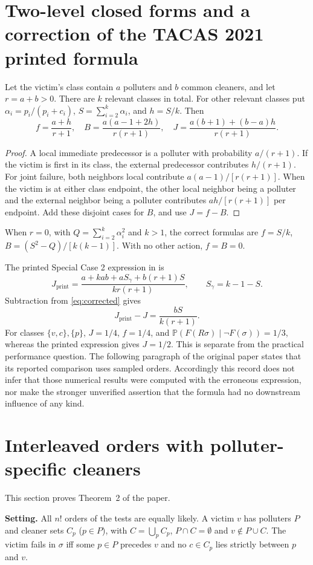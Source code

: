 \documentclass[11pt,a4paper]{article}
\theoremstyle{definition}\newtheorem{definition}[theorem]{Definition}
\theoremstyle{remark}\newtheorem{remark}[theorem]{Remark}
\newcommand{\Prb}{\mathbb P}
\theoremstyle{definition}\newtheorem{xexample}[xtheorem]{Example}\theoremstyle{plain}
\begin{document}
\section{Two-level closed forms and a correction of the TACAS 2021 printed formula}\label{sec:twolevel}
Let the victim's class contain $a$ polluters and $b$ common cleaners, and let $r=a+b>0$. There are $k$ relevant classes in total. For other relevant classes put $\alpha_i=p_i/(p_i+c_i)$, $S=\sum_{i=2}^k\alpha_i$, and $h=S/k$. Then
\begin{equation}\label{eq:corrected}
 f=\frac{a+h}{r+1},\quad
 B=\frac{a(a-1+2h)}{r(r+1)},\quad
 J=\frac{a(b+1)+(b-a)h}{r(r+1)}.
\end{equation}
\begin{proof}
A local immediate predecessor is a polluter with probability $a/(r+1)$. If the victim is first in its class, the external predecessor contributes $h/(r+1)$. For joint failure, both neighbors local contribute $a(a-1)/[r(r+1)]$. When the victim is at either class endpoint, the other local neighbor being a polluter and the external neighbor being a polluter contributes $ah/[r(r+1)]$ per endpoint. Add these disjoint cases for $B$, and use $J=f-B$.
\end{proof}
When $r=0$, with $Q=\sum_{i=2}^k\alpha_i^2$ and $k>1$, the correct formulas are $f=S/k$, $B=(S^2-Q)/[k(k-1)]$. With no other action, $f=B=0$.

The printed Special Case 2 expression in \cite[Section 4.4]{wei} is
\[
 J_{\mathrm{print}}=\frac{a+kab+aS_\gamma+b(r+1)S}{kr(r+1)},
 \qquad S_\gamma=k-1-S.
\]
Subtraction from \eqref{eq:corrected} gives
\[
 J_{\mathrm{print}}-J=\frac{bS}{k(r+1)}.
\]
For classes $\{v,c\},\{p\}$, $J=1/4$, $f=1/4$, and $\Prb(F(R\sigma)\mid\neg F(\sigma))=1/3$, whereas the printed expression gives $J=1/2$. This is separate from the practical performance question. The following paragraph of the original paper states that its reported comparison uses sampled orders. Accordingly this record does not infer that those numerical results were computed with the erroneous expression, nor make the stronger unverified assertion that the formula had no downstream influence of any kind.

\section{Interleaved orders with polluter-specific cleaners}\label{sec:flat}
This section proves Theorem~2 of the paper.

\textbf{Setting.} All $n!$ orders of the tests are equally likely. A victim $v$ has polluters $P$ and cleaner sets $C_p$ ($p\in P$), with $C=\bigcup_p C_p$, $P\cap C=\emptyset$ and $v\notin P\cup C$. The victim fails in $\sigma$ iff some $p\in P$ precedes $v$ and no $c\in C_p$ lies strictly between $p$ and $v$.
\end{document}

